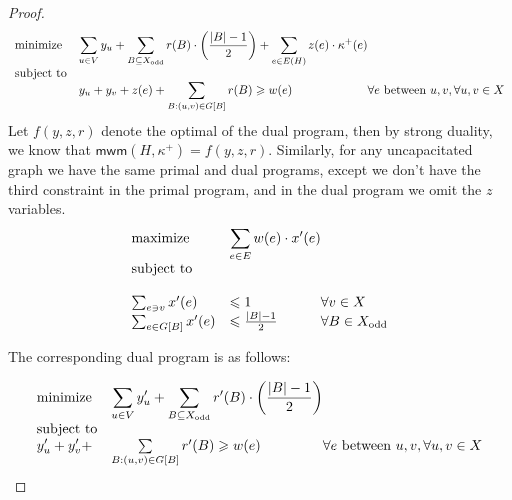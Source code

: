 \documentclass[a4paper,11pt]{article}
\newcommand{\card}[1]{|#1|}
\newcommand{\paren}[1]{\left ( #1 \right )}
\theoremstyle{definition}
\theoremstyle{definition}
\theoremstyle{definition}
\theoremstyle{definition}
\theoremstyle{definition}
\theoremstyle{definition}
\theoremstyle{definition}
\theoremstyle{definition}
\theoremstyle{definition}
\theoremstyle{definition}
\theoremstyle{definition}
\theoremstyle{definition}
\theoremstyle{definition}
\theoremstyle{definition}
\theoremstyle{definition}
\begin{document}
\begin{proof}
\begin{equation}
\begin{array}{ll@{}ll}
\text{minimize}  & \displaystyle\sum\limits_{u\in V} y_u +\sum_{B\subseteq X_{\text{odd}}} r(B)\cdot \paren{\frac{\card{B}-1}{2}} + \sum_{e\in E(H)} z(e)\cdot \kappa^{+}(e)&\\
\text{subject to}& \\
&\displaystyle y_{u}+y_{v}+z(e) + \sum\limits_{B: (u,v)\in G[B]} r(B)\geqslant w(e)& \forall e\text{ between }u,v, \forall u,v\in X\\
\end{array}
\end{equation}
Let $f(y,z,r)$ denote the optimal of the dual program, then by strong duality, we know that $\textsf{mwm}(H,\kappa^+) = f(y,z,r)$. Similarly, for any uncapacitated graph we have the same primal and dual programs, except we don't have the third constraint in the primal program, and in the dual program we omit the $z$ variables. 
\begin{equation}
\begin{array}{ll@{}ll}
\text{maximize}  & \displaystyle\sum\limits_{e\in E} w(e)\cdot x'(e) &\\
\text{subject to}& \\ \\
\sum_{e\ni v} x'(e)&\leqslant 1 &\forall v\in X\\
\sum_{e\in G[B]} x'(e)&\leqslant \frac{|B|-1}{2}& \forall B\in X_{\text{odd}}
\end{array}
\end{equation}

The corresponding dual program is as follows:

\begin{equation*}
\begin{array}{ll@{}ll}
\text{minimize}  & \displaystyle\sum\limits_{u\in V} y'_u +\sum_{B\subseteq X_{\text{odd}}} r'(B)\cdot \paren{\frac{\card{B}-1}{2}}&\\
\text{subject to}& &\\
\displaystyle y'_{u}+y'_{v}+ &\sum\limits_{B: (u,v)\in G[B]} r'(B)\geqslant w(e)& \forall e\text{ between }u,v, \forall u,v\in X\\
\end{array}
\end{equation*}


\end{proof}
\end{document}

